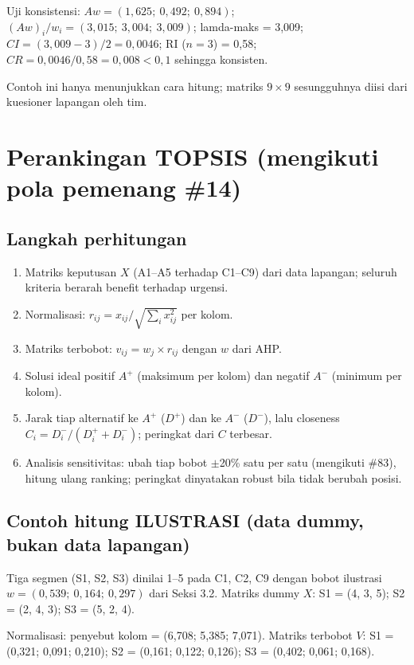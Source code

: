 \documentclass[a4paper,11pt]{article}
\begin{document}
Uji konsistensi: \(Aw = (1{,}625;\ 0{,}492;\ 0{,}894)\); \((Aw)_i/w_i = (3{,}015;\ 3{,}004;\ 3{,}009)\); lamda-maks = 3,009; \(CI = (3{,}009-3)/2 = 0{,}0046\); RI (\(n = 3\)) = 0,58; \(CR = 0{,}0046/0{,}58 = 0{,}008 < 0{,}1\) sehingga konsisten.

Contoh ini hanya menunjukkan cara hitung; matriks \(9 \times 9\) sesungguhnya diisi dari kuesioner lapangan oleh tim.

\section{Perankingan TOPSIS (mengikuti pola pemenang \#14)}

\subsection{Langkah perhitungan}

\begin{enumerate}
\item Matriks keputusan \(X\) (A1--A5 terhadap C1--C9) dari data lapangan; seluruh kriteria berarah benefit terhadap urgensi.
\item Normalisasi: \(r_{ij} = x_{ij}/\sqrt{\sum_i x_{ij}^2}\) per kolom.
\item Matriks terbobot: \(v_{ij} = w_j \times r_{ij}\) dengan \(w\) dari AHP.
\item Solusi ideal positif \(A^+\) (maksimum per kolom) dan negatif \(A^-\) (minimum per kolom).
\item Jarak tiap alternatif ke \(A^+\) (\(D^+\)) dan ke \(A^-\) (\(D^-\)), lalu closeness \(C_i = D^-_i/(D^+_i + D^-_i)\); peringkat dari \(C\) terbesar.
\item Analisis sensitivitas: ubah tiap bobot \(\pm\)20\% satu per satu (mengikuti \#83), hitung ulang ranking; peringkat dinyatakan robust bila tidak berubah posisi.
\end{enumerate}

\subsection{Contoh hitung ILUSTRASI (data dummy, bukan data lapangan)}

Tiga segmen (S1, S2, S3) dinilai 1--5 pada C1, C2, C9 dengan bobot ilustrasi \(w = (0{,}539;\ 0{,}164;\ 0{,}297)\) dari Seksi 3.2. Matriks dummy \(X\): S1 = (4, 3, 5); S2 = (2, 4, 3); S3 = (5, 2, 4).

Normalisasi: penyebut kolom = (6,708; 5,385; 7,071). Matriks terbobot \(V\): S1 = (0,321; 0,091; 0,210); S2 = (0,161; 0,122; 0,126); S3 = (0,402; 0,061; 0,168).
\end{document}
